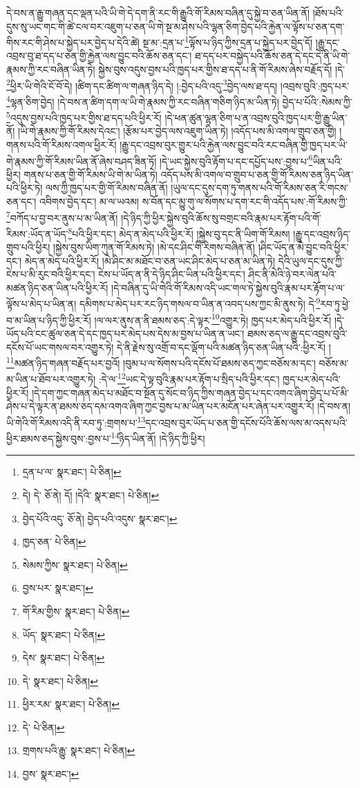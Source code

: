 དེ་བས་ན་རྒྱུ་གཞན་དང་ལྡན་པའི་ཡི་གེ་དེ་དག་ནི་རང་གི་རྒྱུའི་གོ་རིམས་བཞིན་དུ་སྐྱེ་བ་ཅན་ཡིན་ནོ། །ཐོས་པའི་དུས་སུ་ཡང་གང་གི་ཚེ་ངལ་བར་འཇུག་པ་ཅན་ཡི་གེ་སྔ་མ་ཤེས་པའི་ལྷན་ཅིག་བྱེད་པའི་རྐྱེན་ལ་ལྟོས་པ་ཅན་དག་གིས་རང་གི་ཤེས་པ་སྐྱེད་པར་བྱེད་པ་དེའི་ཚེ། སྔ་མ་:དྲན་པ་\footnote{དྲན་པ་ལ་  སྣར་ཐང་།  པེ་ཅིན། }ལྟོས་པ་ཉིད་ཀྱིས་དྲན་པ་སྐྱེད་པར་བྱེད་དོ། །རྒྱུ་དང་འབྲས་བུ་ཐ་དད་པ་ཅན་གྱི་རྐྱེན་ལས་བྱུང་བའི་ཆོས་ཅན་དང་། ཐ་དད་པར་བསྐྱེད་པའི་ཆོས་ཅན་དེ་དང་དེ་ནི་ཡི་གེ་རྣམས་ཀྱི་རང་བཞིན་ཡིན་ཏེ། སྐྱེས་བུས་འདུས་བྱས་པའི་ཁྱད་པར་གྱིས་ཐ་དད་པ་ནི་གོ་རིམས་ཞེས་བརྗོད་དོ། །དེ་\footnote{དེ། དེ་  ཅོ་ནེ། དོ། །དེའི་  སྣར་ཐང་།  པེ་ཅིན། }ཕྱིར་ཡི་གེའི་ངོ་བོ་དེ། །ཚིག་དང་ཚིག་ལ་གཞན་ཉིད་དེ། །:བྱེད་པའི་འདུ་\footnote{བྱེད་པོའི་འདུ་  ཅོ་ནེ། བྱེད་པའི་འདུས་  སྣར་ཐང་། }བྱེད་ལས་ཐ་དད། །འབྲས་བུའི་:ཁྱད་པར་\footnote{ཁྱད་ཅན་  པེ་ཅིན། }ལྷན་ཅིག་བྱེད། །དེ་བས་ན་ཚིག་དག་ལ་ཡི་གེ་རྣམས་ཀྱི་རང་བཞིན་གཅིག་ཉིད་མ་ཡིན་ཏེ། བྱེད་པ་པོའི་:སེམས་ཀྱི་\footnote{སེམས་ཀྱིས་  སྣར་ཐང་།  པེ་ཅིན། }འདུས་བྱས་པའི་ཁྱད་པར་གྱིས་ཐ་དད་པའི་ཕྱིར་རོ། །དེ་ཕན་ཚུན་ལྷན་ཅིག་པ་ན་འབྲས་བུའི་ཁྱད་པར་གྱི་རྒྱུ་ཡིན་ནོ། །ཡི་གེ་རྣམས་ཀྱི་གོ་རིམས་དེའང་། །རྩོམ་པར་བྱེད་ལས་འཇུག་ཡིན་ཏེ། །འདོད་པས་མི་འགལ་གྲུབ་ཅན་གྱི། །གནས་པའི་གོ་རིམས་འགལ་ཕྱིར་རོ། །རྒྱུ་དང་འབྲས་བུར་གྱུར་པའི་རྐྱེན་ལས་བྱུང་བའི་རང་བཞིན་གྱི་ཁྱད་པར་ཡི་གེ་རྣམས་ཀྱི་གོ་རིམས་ཡིན་ནོ་ཞེས་བཤད་ཟིན་ཏོ། །དེ་ཡང་སྐྱེས་བུའི་རྟོག་པ་དང་དཔྱོད་པས་:བྱས་པ་\footnote{བྱས་པར་  སྣར་ཐང་། }ཡིན་པའི་ཕྱིར། གནས་པ་ཅན་གྱི་གོ་རིམས་ཡི་གེ་མ་ཡིན་ཏེ། འདོད་པས་མི་འགལ་བ་གྲུབ་པ་ཅན་གྱི་གོ་རིམས་ཅན་ཉིད་ཡིན་པའི་ཕྱིར་ཏེ། ལས་ཀྱི་ཁྱད་པར་གྱི་གོ་རིམས་བཞིན་ནོ། །ཡུལ་དང་དུས་དག་ཏུ་གནས་པའི་གོ་རིམས་ཅན་རི་གངས་ཅན་དང་། འབིགས་བྱེད་དང་། མ་ལ་ཡའམ། ས་བོན་དང་མྱུ་གུ་ལ་སོགས་པ་དག་རང་གི་འདོད་པས་:གོ་རིམས་ཀྱི་\footnote{གོ་རིམ་གྱིས་  སྣར་ཐང་།  པེ་ཅིན། }བཀོད་པ་བྱ་བར་ནུས་པ་མ་ཡིན་ནོ། །དེ་ཉིད་ཀྱི་ཕྱིར་སྐྱེས་བུའི་ཆོས་སུ་བགྲང་བའི་རྣམ་པར་རྟོག་པའི་གོ་རིམས་:ཡོད་ན་ཡོད་\footnote{ཡོད་  སྣར་ཐང་།  པེ་ཅིན། }པའི་ཕྱིར་དང་། མེད་ན་མེད་པའི་ཕྱིར་རོ། །སྐྱེས་བུ་དང་ནི་ཡིག་གོ་རིམས། །རྒྱུ་དང་འབྲས་ཉིད་གྲུབ་པའི་ཕྱིར། །སྐྱེས་བུས་ཡིག་ཀུན་གོ་རིམས་ཏེ། །མེ་དང་ཤིང་གི་རིགས་བཞིན་ནོ། །ཤིང་ཡོད་ན་མེ་བྱུང་བའི་ཕྱིར་དང་། མེད་ན་མེད་པའི་ཕྱིར་རོ། །མེ་ཤིང་མ་མཐོང་བ་ཅན་ཡང་ཤིང་མེད་པ་ཅན་མ་ཡིན་ཏེ། དེའི་ཡུལ་དང་དུས་ཀྱི་ངེས་པ་མི་རུང་བའི་ཕྱིར་དང་། ངེས་པ་ཡོད་ན་ནི་དེ་ཉིད་ཤིང་ཡིན་པའི་ཕྱིར་དང་། ཤིང་ནི་མེའི་ཉེ་བར་ལེན་པའི་མཚན་ཉིད་ཅན་ཡིན་པའི་ཕྱིར་རོ། །དེ་བཞིན་དུ་ཡི་གེའི་གོ་རིམས་འདི་ཡང་གལ་ཏེ་སྐྱེས་བུའི་རྣམ་པར་རྟོག་པ་ལ་ལྟོས་པ་མེད་པ་ཡིན་ན། དམིགས་པ་མེད་པར་རང་ཉིད་གསལ་བ་ཡིན་ན་འབད་པས་ཀྱང་མི་ནུས་ཏེ། དེ་\footnote{དེས་  སྣར་ཐང་།  པེ་ཅིན། }རབ་ཏུ་ཕྱེ་བ་མ་ཡིན་པ་ཉིད་ཀྱི་ཕྱིར་རོ། །ལ་ལར་ནུས་ན་ནི་ཐམས་ཅད་:དེ་ལྟར་\footnote{དེ་  སྣར་ཐང་།  པེ་ཅིན། }འགྱུར་ཏེ། ཁྱད་པར་མེད་པའི་ཕྱིར་རོ། །དེ་ཡོད་པའི་ངང་ཚུལ་ཅན་དེ་དང་ཁྱད་པར་མེད་པས་དེས་མ་བྱས་པ་ཡིན་ན་ཡང་། ཐམས་ཅད་ལ་རྒྱུ་དང་འབྲས་བུའི་དངོས་པོ་ཡང་གསལ་བར་འགྱུར་ཏེ། དེ་ནི་རྗེས་སུ་འགྲོ་བ་དང་ལྡོག་པའི་མཚན་ཉིད་ཅན་ཡིན་པའི་:ཕྱིར་རོ། །\footnote{ཕྱིར་རམ་  སྣར་ཐང་།  པེ་ཅིན། }མཚན་ཉིད་གཞན་བརྗོད་པར་བྱའོ། །བུམ་པ་ལ་སོགས་པའི་དངོས་པོ་ཐམས་ཅད་ཀྱང་བཅོས་མ་དང་། བཅོས་མ་མ་ཡིན་པ་ཐོབ་པར་འགྱུར་ཏེ། :དེ་ལ་\footnote{དེ་  པེ་ཅིན། }ཡང་དེ་ལྟ་བུའི་རྣམ་པར་རྟོག་པ་སྲིད་པའི་ཕྱིར་དང་། ཁྱད་པར་མེད་པའི་ཕྱིར་རོ། །དེ་དག་ཀྱང་གཞན་མེད་པ་མཐོང་བ་སྔོན་དུ་སོང་བ་ཉིད་ཀྱིས་གཞན་བྱེད་པ་དང་འགའ་ཞིག་བྱེད་པ་པོ་མི་ཤེས་པ་དེ་ལྟར་ན་ཐམས་ཅད་དམ་འགའ་ཞིག་ཀྱང་བྱས་པ་མ་ཡིན་པར་མངོན་པར་ཞེན་པར་འགྱུར་རོ། །དེ་བས་ན། ཡི་གེའི་གོ་རིམས་འདི་ནི་རབ་ཏུ་:གྲགས་པ་\footnote{གྲགས་པའི་རྒྱུ་  སྣར་ཐང་།  པེ་ཅིན། }དང་འབྲས་བུར་ཡོད་པ་ཅན་གྱི་དངོས་པོའི་ཆོས་ལས་མ་འདས་པའི་ཕྱིར་ཐམས་ཅད་སྐྱེས་བུས་:བྱས་པ་\footnote{བྱས་  སྣར་ཐང་། }ཉིད་ཡིན་ནོ། །དེ་ཉིད་ཀྱི་ཕྱིར། 